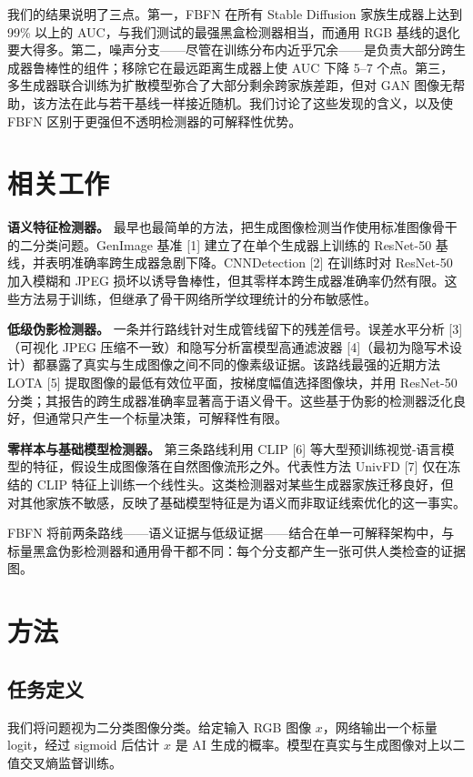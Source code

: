 \documentclass[11pt]{ctexart}
\begin{document}
我们的结果说明了三点。第一，FBFN 在所有 Stable Diffusion 家族生成器上达到 99\% 以上的 AUC，与我们测试的最强黑盒检测器相当，而通用 RGB 基线的退化要大得多。第二，噪声分支——尽管在训练分布内近乎冗余——是负责大部分跨生成器鲁棒性的组件；移除它在最远距离生成器上使 AUC 下降 5--7 个点。第三，多生成器联合训练为扩散模型弥合了大部分剩余跨家族差距，但对 GAN 图像无帮助，该方法在此与若干基线一样接近随机。我们讨论了这些发现的含义，以及使 FBFN 区别于更强但不透明检测器的可解释性优势。

\section{相关工作}

\textbf{语义特征检测器。} 最早也最简单的方法，把生成图像检测当作使用标准图像骨干的二分类问题。GenImage 基准 [1] 建立了在单个生成器上训练的 ResNet-50 基线，并表明准确率跨生成器急剧下降。CNNDetection [2] 在训练时对 ResNet-50 加入模糊和 JPEG 损坏以诱导鲁棒性，但其零样本跨生成器准确率仍然有限。这些方法易于训练，但继承了骨干网络所学纹理统计的分布敏感性。

\textbf{低级伪影检测器。} 一条并行路线针对生成管线留下的残差信号。误差水平分析 [3]（可视化 JPEG 压缩不一致）和隐写分析富模型高通滤波器 [4]（最初为隐写术设计）都暴露了真实与生成图像之间不同的像素级证据。该路线最强的近期方法 LOTA [5] 提取图像的最低有效位平面，按梯度幅值选择图像块，并用 ResNet-50 分类；其报告的跨生成器准确率显著高于语义骨干。这些基于伪影的检测器泛化良好，但通常只产生一个标量决策，可解释性有限。

\textbf{零样本与基础模型检测器。} 第三条路线利用 CLIP [6] 等大型预训练视觉-语言模型的特征，假设生成图像落在自然图像流形之外。代表性方法 UnivFD [7] 仅在冻结的 CLIP 特征上训练一个线性头。这类检测器对某些生成器家族迁移良好，但对其他家族不敏感，反映了基础模型特征是为语义而非取证线索优化的这一事实。

FBFN 将前两条路线——语义证据与低级证据——结合在单一可解释架构中，与标量黑盒伪影检测器和通用骨干都不同：每个分支都产生一张可供人类检查的证据图。

\section{方法}

\subsection{任务定义}

我们将问题视为二分类图像分类。给定输入 RGB 图像 $x$，网络输出一个标量 logit，经过 sigmoid 后估计 $x$ 是 AI 生成的概率。模型在真实与生成图像对上以二值交叉熵监督训练。
\end{document}

